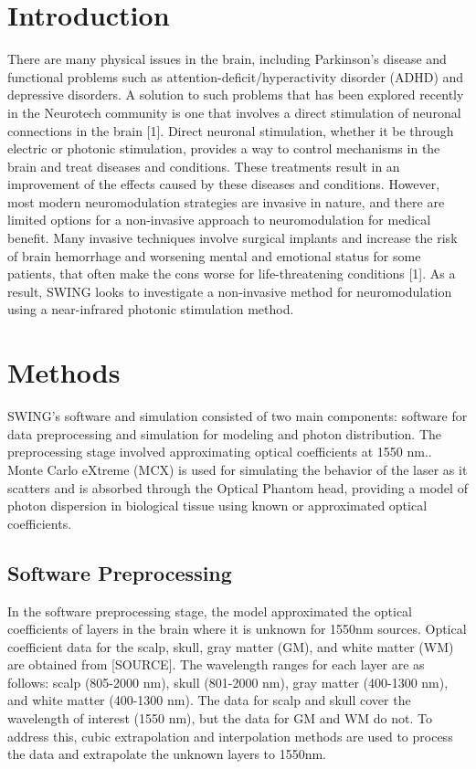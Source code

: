 \documentclass[journal,twoside,web]{ieeecolor}
\begin{document}
\section{Introduction}
\label{sec:introduction}
There are many physical issues in the brain, including Parkinson's disease and functional problems such as attention-deficit/hyperactivity disorder (ADHD)  
and depressive disorders. A solution to such problems that has been explored recently in the Neurotech community is one that involves a direct stimulation of  
neuronal connections in the brain [1]. Direct neuronal stimulation, whether it be through electric or photonic stimulation, provides a way to control  
mechanisms in the brain and treat diseases and conditions. These treatments result in an improvement of the effects caused by these diseases and conditions.  
However, most modern neuromodulation strategies are invasive in nature, and there are limited options for a non-invasive approach to neuromodulation for medical benefit.  
Many invasive techniques involve surgical implants and increase the risk of brain hemorrhage and worsening mental and emotional status for some patients,  
that often make the cons worse for life-threatening conditions [1]. As a result, SWING looks to investigate a non-invasive method for neuromodulation  
using a near-infrared photonic stimulation method. 


\section{Methods}
\label{sec:methods}
SWING's software and simulation consisted of two main components: software for data preprocessing and simulation for modeling and photon distribution. 
The preprocessing stage involved approximating optical coefficients at 1550 nm.. Monte Carlo eXtreme (MCX) is used for simulating the 
behavior of the laser as it scatters and is absorbed through the Optical Phantom head, providing a model of photon dispersion in biological tissue using known or 
approximated optical coefficients.

\subsection{Software Preprocessing}
In the software preprocessing stage, the model approximated the optical coefficients of layers in the brain where it is unknown for 1550nm sources. Optical coefficient data for the scalp, skull, gray matter (GM), and white matter (WM) are obtained from [SOURCE]. The wavelength ranges for each layer are as follows: scalp (805-2000 nm), 
skull (801-2000 nm), gray matter (400-1300 nm), and white matter (400-1300 nm). The data for scalp and skull cover the wavelength of interest (1550 nm), but the data 
for GM and WM do not. To address this, cubic extrapolation and interpolation methods are used to process the data and extrapolate the unknown layers to 1550nm. 
\end{document}
